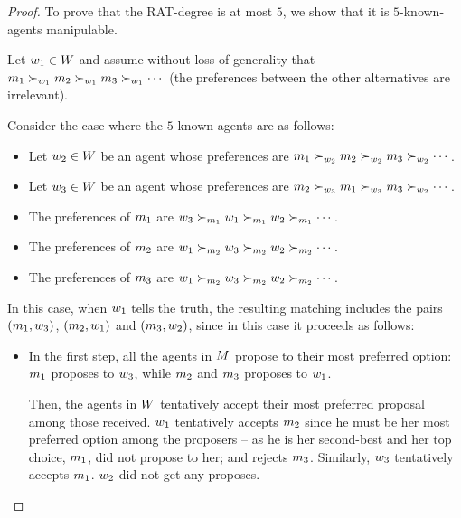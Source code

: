 \begin{proof}
    To prove that the RAT-degree is at most $5$, we show that it is $5$-known-agents manipulable. 

    Let $w_1 \in W$ and assume without loss of generality that $m_1 \succ_{w_1} m_2 \succ_{w_1} m_3 \succ_{w_1} \cdots$  (the preferences between the other alternatives are irrelevant).

    Consider the case where the $5$-known-agents are as follows:
    \begin{itemize}
        \item Let $w_2 \in W$ be an agent whose preferences are $m_1 \succ_{w_2} m_2 \succ_{w_2} m_3 \succ_{w_2} \cdots $.
        
        \item Let $w_3 \in W$ be an agent whose preferences are $m_2 \succ_{w_3} m_1 \succ_{w_3} m_3 \succ_{w_2} \cdots $.

        \item The preferences of $m_1$ are $w_3 \succ_{m_1} w_1 \succ_{m_1} w_2 \succ_{m_1} \cdots$.

        \item The preferences of $m_2$ are $w_1 \succ_{m_2} w_3 \succ_{m_2} w_2 \succ_{m_2} \cdots$.

        \item The preferences of $m_3$ are $w_1 \succ_{m_2} w_3 \succ_{m_2} w_2 \succ_{m_2} \cdots$.
    \end{itemize}



    In this case, when $w_1$ tells the truth, the resulting matching includes the pairs $(m_1, w_3)$, $(m_2, w_1)$ and $(m_3, w_2)$, since in this case it proceeds as follows:
    \begin{itemize}
        \item In the first step, all the agents in $M$ propose to their most preferred option: $m_1$ proposes to $w_3$, while $m_2$ and $m_3$ proposes to $w_1$.

        Then, the agents in $W$ tentatively accept their most preferred proposal among those received.
        $w_1$ tentatively accepts $m_2$ since he must be her most preferred option among the proposers -- as he is her second-best and her top choice, $m_1$, did not propose to her; and rejects $m_3$.
        Similarly, $w_3$ tentatively accepts $m_1$.
        $w_2$ did not get any proposes.  


\end{itemize}
\end{proof}
